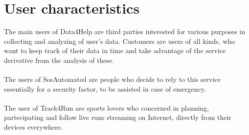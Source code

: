 \section{User characteristics}
The main users of Data4Help are third parties interested for various purposes in collecting and analyzing of user's data.
Customers are users of all kinds, who want to keep track of their data in time and take advantage of the service derivative from the analysis of these.
\\ \\The users of SosAutomated are people who decide to rely to this service essentially for a security factor, to be assisted in case of emergency.
\\ \\The user of Track4Run are sports lovers who concerned in planning, partecipating and follow live runs streaming on Internet, directly from their devices everywhere. 
 


